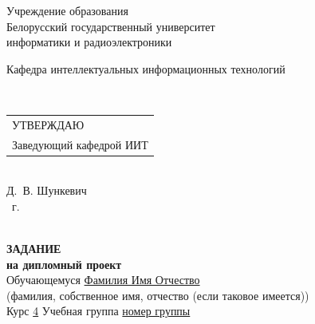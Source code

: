 {
  \thispagestyle{empty}
  \setlength{\parindent}{0em}

  \newcommand{\lineunderscore}{\uline{\hspace*{\fill}}}

  \begin{center}
    Учреждение образования\\
    Белорусский государственный университет\\
    информатики и радиоэлектроники\\[0.5em]


  \begin{minipage}{\textwidth}
      Кафедра интеллектуальных информационных технологий
  \end{minipage}\\[2em]

  \begin{minipage}{\textwidth}
    \begin{flushright}
      \begin{tabular}{@{}l@{}}
        УТВЕРЖДАЮ\\[0.5em]
        Заведующий кафедрой ИИТ
      \end{tabular}\\[0.7em]
      \underline{\hspace*{5.3em}} Д.~В. Шункевич\\ [0.5em]
      \underline{\hspace*{1.9em}} \underline{\hspace*{7.8em}} \the\year{}~г.
    \end{flushright}
  \end{minipage}\\[2em]

  \textbf{ЗАДАНИЕ} \\
  \textbf{на дипломный проект}\\[1em]

  Обучающемуся \uline{\hspace*{2em}}\uline{Фамилия Имя Отчество}\lineunderscore \\
  {\footnotesize\hspace{9em}(фамилия, собственное имя, отчество (если таковое имеется))}\\

  Курс \uline{4\hspace*{2em}} Учебная группа \uline{номер группы}\lineunderscore\\[0.5em]


\end{center}}
